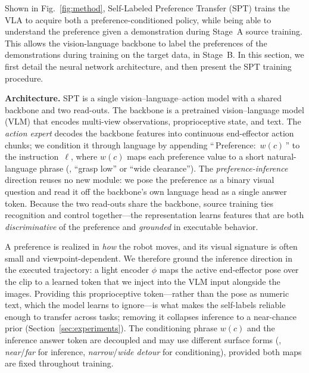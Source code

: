 \documentclass{article}
\begin{document}
Shown in Fig.~\ref{fig:method}, Self-Labeled Preference Transfer (SPT) trains the VLA to acquire both a preference-conditioned policy, while being able to understand the preference given a demonstration during Stage~A source training. This allows the vision-language backbone to label the preferences of the demonstrations during training on the target data, in Stage~B. In this section, we first detail the neural network architecture, and then present the SPT training procedure.

\textbf{Architecture.}
SPT is a single vision--language--action model with a shared backbone and two
read-outs. The backbone is a pretrained vision--language model (VLM) that
encodes multi-view observations, proprioceptive state, and text. The
\emph{action expert} decodes the backbone features into continuous end-effector
action chunks; we condition it through language by appending
``\,Preference:~$w(c)$\,'' to the instruction~$\ell$, where $w(c)$ maps each
preference value to a short natural-language phrase
(\eg{}, ``grasp low'' or ``wide clearance''). The \emph{preference-inference}
direction reuses no new module: we pose the preference as a binary visual
question and read it off the backbone's own language head as a single answer
token. Because the two read-outs share the backbone, source training ties
recognition and control together---the representation learns features that are
both \emph{discriminative} of the preference and \emph{grounded} in executable
behavior.

A preference is realized in \emph{how} the robot moves, and its visual signature
is often small and viewpoint-dependent. We therefore ground the inference
direction in the executed trajectory: a light encoder $\phi$ maps the
active end-effector pose over the clip to a learned token that we inject into the
VLM input alongside the images. Providing this proprioceptive token---rather than
the pose as numeric text, which the model learns to ignore---is what makes the
self-labels reliable enough to transfer across tasks; removing it collapses
inference to a near-chance prior (Section~\ref{sec:experiments}). The
conditioning phrase $w(c)$ and the inference answer token are decoupled and may
use different surface forms (\eg{}, \emph{near}/\emph{far} for inference,
\emph{narrow}/\emph{wide detour} for conditioning), provided both maps are fixed
throughout training.
\end{document}
